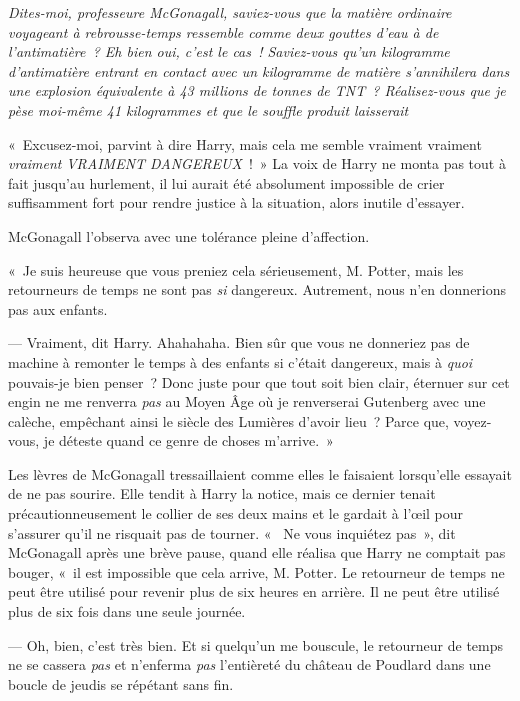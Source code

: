 \emph{Dites-moi, professeure McGonagall, saviez-vous que la matière ordinaire voyageant à rebrousse-temps ressemble comme deux gouttes d'eau à de l'antimatière~?
Eh bien oui, c'est le cas~!
Saviez-vous qu'un kilogramme d'antimatière entrant en contact avec un kilogramme de matière s'annihilera dans une explosion équivalente à 43 millions de tonnes de TNT~?
Réalisez-vous que je pèse moi-même 41 kilogrammes et que le souffle produit laisserait }

«~Excusez-moi, parvint à dire Harry, mais cela me semble vraiment vraiment \emph{vraiment} \emph{VRAIMENT DANGEREUX}~!~»
La voix de Harry ne monta pas tout à fait jusqu'au hurlement, il lui aurait été absolument impossible de crier suffisamment fort pour rendre justice à la situation, alors inutile d'essayer.

McGonagall l'observa avec une tolérance pleine d'affection.

«~Je suis heureuse que vous preniez cela sérieusement, M. Potter, mais les retourneurs de temps ne sont pas \emph{si} dangereux.
Autrement, nous n'en donnerions pas aux enfants.

--- Vraiment, dit Harry.
Ahahahaha.
Bien sûr que vous ne donneriez pas de machine à remonter le temps à des enfants si c'était dangereux, mais à \emph{quoi} pouvais-je bien penser~?
Donc juste pour que tout soit bien clair, éternuer sur cet engin ne me renverra \emph{pas} au Moyen Âge où je renverserai Gutenberg avec une calèche, empêchant ainsi le siècle des Lumières d'avoir lieu~?
Parce que, voyez-vous, je déteste quand ce genre de choses m'arrive.~»

Les lèvres de McGonagall tressaillaient comme elles le faisaient lorsqu'elle essayait de ne pas sourire.
Elle tendit à Harry la notice, mais ce dernier tenait précautionneusement le collier de ses deux mains et le gardait à l'œil pour s'assurer qu'il ne risquait pas de tourner.
«~ Ne vous inquiétez pas~», dit McGonagall après une brève pause, quand elle réalisa que Harry ne comptait pas bouger, «~il est impossible que cela arrive, M. Potter.
Le retourneur de temps ne peut être utilisé pour revenir plus de six heures en arrière.
Il ne peut être utilisé plus de six fois dans une seule journée.

--- Oh, bien, c'est très bien.
Et si quelqu'un me bouscule, le retourneur de temps ne se cassera \emph{pas} et n'enferma \emph{pas} l'entièreté du château de Poudlard dans une boucle de jeudis se répétant sans fin.

